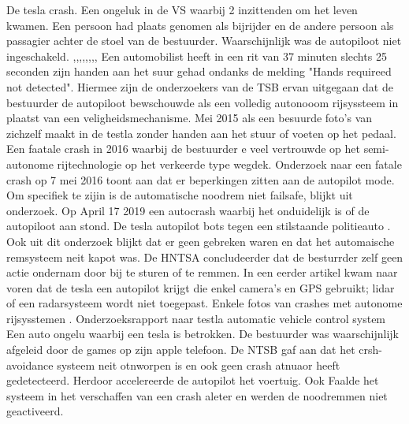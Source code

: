  De tesla crash.
Een ongeluk in  de VS waarbij 2 inzittenden om het leven kwamen. Een persoon had plaats genomen als bijrijder en de andere persoon als passagier achter de stoel van de bestuurder. Waarschijnlijk was de autopiloot niet ingeschakeld.
\cite{anderson30042021secondteslacrash},\cite{raynal20042021probeTeslaCrash},\cite{firstpress11052021fatalnonautopilot},\cite{cochran18042021nodriverTeslaCrash},\cite{gitlin11052021autopilot},\cite{sommerfield12072021NHTSAmandateresult},\cite{hawkins30062021nhtsarequiresreporting},\cite{wilson19042021teslacrashregulators},\cite{mcfarland22042021selfdrivingrisks}
Een automobilist heeft in een rit van 37 minuten slechts 25 seconden zijn handen aan het suur gehad ondanks de melding "Hands requireed not detected". Hiermee zijn de onderzoekers van de TSB ervan uitgegaan dat de bestuurder de autopiloot bewschouwde als een volledig autonooom rijsyssteem in plaatst van een veligheidsmechanisme.
\cite{oremus21062017fatalTeslaCrash}
Mei 2015 als een besuurde foto's van zichzelf maakt in de testla zonder handen aan het stuur of voeten op het pedaal.
\cite{guardian15052021teslacrashHandsOnWheel}
Een faatale crash in 2016 waarbij de bestuurder  e veel vertrouwde op het semi-autonome rijtechnologie op het verkeerde type wegdek.
\cite{Puzzanghera13092017TeslaSharesBlame}
Onderzoek naar een fatale crash op 7 mei 2016 toont aan dat er beperkingen zitten aan de autopilot mode. Om specifiek te zijin is de automatische noodrem niet failsafe, blijkt uit onderzoek.
\cite{jaillet02022017teslaAutopilotLimitations}
\cite{reuters03102019teslaAutoParkingFail}
\cite{dowling23042021}
Op  April 17 2019 een autocrash waarbij het onduidelijk is of de autopiloot aan stond.
\cite{young05112021fatalTeslaReport}
De tesla autopilot bots tegen een stilstaande politieauto
\cite{kierstein18032021teslaAutopilotCrashStationary}. Ook uit dit onderzoek blijkt dat er geen gebreken waren en dat het automaische remsysteem neit kapot was. De HNTSA concludeerder dat de besturrder zelf geen actie ondernam door  bij te sturen of te remmen. In een eerder artikel kwam naar voren dat de tesla een autopilot krijgt die enkel camera's en GPS gebruikt; lidar of een radarsysteem wordt niet toegepast.
\cite{janssen20062017teslacrashdetailflorida}
Enkele fotos van crashes met autonome rijsysstemen \cite{saferoardsCrashesAutonomousvehicles}.
\cite{stephardson18032021revieuwingtesla}
Onderzoeksrapport naar testla automatic vehicle control system
\cite{habib28062016NHTSATeslaReport}
Een auto ongelu waarbij een tesla is betrokken. De bestuurder was waarschijnlijk afgeleid door de games op zijn apple telefoon. De NTSB gaf aan dat het crsh-avoidance systeem neit otnworpen is en ook geen crash atnuaor heeft gedetecteerd. Herdoor accelereerde de autopilot  het voertuig. Ook Faalde het systeem in het verschaffen van een crash aleter en werden de noodremmen niet geactiveerd.
